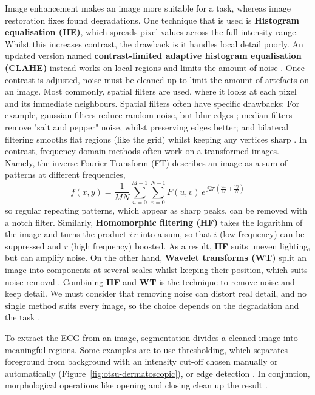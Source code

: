 Image enhancement makes an image more suitable for a task, whereas image restoration fixes found degradations. One technique that is used is \textbf{Histogram equalisation (HE)}, which spreads pixel values across
the full intensity range. Whilst this increases contrast, the drawback is it handles local detail poorly. An updated version named \textbf{contrast-limited adaptive histogram equalisation (CLAHE)} instead works on local
regions and limits the amount of noise \cite{zuiderveld_contrast_1994}. Once  contrast is adjusted, noise must be cleaned up to limit the amount of artefacts on an image. Most commonly, spatial filters are used, where it looks at each pixel and its immediate neighbours. Spatial
filters often have specific drawbacks: For example, gaussian filters reduce random noise, but blur edges
\cite{gonzalez_digital_2018}; median filters remove "salt and pepper" noise, whilst preserving
edges better; and bilateral filtering smooths flat regions (like the grid) whilst keeping any vertices sharp \cite{verma_ali_2013}. In contrast, frequency-domain methods often work on a transformed images. Namely, the
inverse Fourier Transform (FT) describes an image as a sum of patterns at different frequencies,
\begin{equation}
  f(x,y) = \frac{1}{MN}\sum_{u=0}^{M-1}\sum_{v=0}^{N-1}
           F(u,v)\,e^{\,j2\pi\left(\frac{ux}{M}+\frac{vy}{N}\right)}
  \label{eq:inv-fourier}
\end{equation}
so regular repeating patterns, which appear as sharp peaks, can be removed with a
notch filter. Similarly, \textbf{Homomorphic filtering (HF)} takes the logarithm of the image and turns the product $i\,r$ into a sum, so that $i$ (low frequency) can be
suppressed and $r$ (high frequency) boosted. As a result, \textbf{HF} suits uneven lighting, but can amplify noise. On the other hand, \textbf{Wavelet transforms (WT)} split an image into components at
several scales whilst keeping their position, which suits noise removal
\cite{lepcha_deep_2023}. Combining \textbf{HF} and \textbf{WT} is the technique to remove noise and keep detail. We must consider that removing noise can distort real
detail, and no single method suits every image, so the choice depends on the
degradation and the task \cite{qi_comprehensive_2022}.

To extract the ECG from an image, segmentation divides a cleaned image into meaningful regions. Some examples are to use thresholding,
which separates foreground from background with an intensity cut-off chosen manually or
automatically \cite{otsu_threshold_1979} (Figure~\ref{fig:otsu-dermatoscopic}), or edge
detection \cite{canny_computational_1986}. In conjuntion, morphological operations like opening and
closing clean up the result \cite{gonzalez_digital_2018}.

